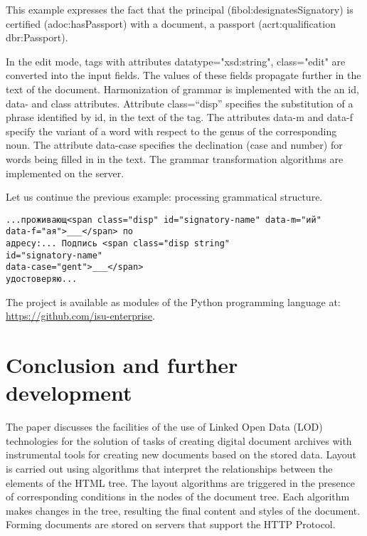 \documentclass[12pt]{llncs}
\begin{document}
This example expresses the fact that the principal
(fibol:designatesSignatory) is certified (adoc:hasPassport) with a
document, a passport (acrt:qualification dbr:Passport).

In the edit mode, tags with attributes
datatype="xsd:string", class="edit" are converted into the input
fields. The values of these fields propagate further in the text of the
document. Harmonization of grammar is implemented with the an id, data-
and class attributes. Attribute class=``disp'' specifies the
substitution of a phrase identified by id, in the text of the tag. The
attributes data-m and data-f specify the variant of a word with respect
to the genus of the corresponding noun. The attribute data-case
specifies the declination (case and number) for words being filled in in
the text. The grammar transformation algorithms are implemented on the
server.

Let us continue the previous example: processing grammatical structure.

\begin{russian}\footnotesize
\begin{verbatim}
...проживающ<span class="disp" id="signatory-name" data-m="ий"
data-f="ая">___</span> по
адресу:... Подпись <span class="disp string"
id="signatory-name"
data-case="gent">___</span>
удостоверяю...
\end{verbatim}
\end{russian}

The project is available as modules of the Python programming language
at: \url{https://github.com/isu-enterprise}.

\section{Conclusion and further development}
\label{sec:conc}

The paper discusses the facilities of the use of Linked Open Data (LOD)
technologies for the solution of tasks of {creating} digital document
archives with instrumental tools for creating new documents based on the
stored data. Layout is carried out using algorithms that interpret the
relationships between the elements of the HTML tree. The layout
algorithms are triggered in the presence of corresponding conditions in
the nodes of the document tree. Each algorithm makes changes in the
tree, resulting the final content and styles of the document. Forming
documents are stored on servers that support the HTTP Protocol.
\end{document}
